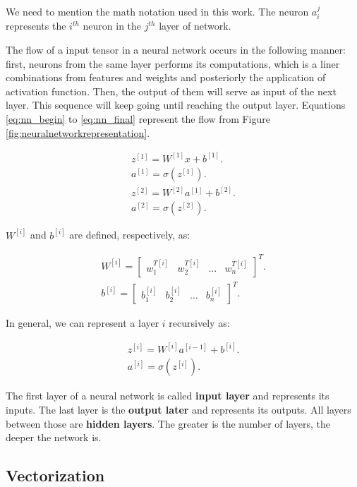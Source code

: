 We need to mention the math notation used in this work. The neuron $a^{j}_{i}$ represents the $i^{th}$ neuron in the $j^{th}$ layer of network.

The flow of a input tensor in a neural network occurs in the following manner: first, neurons from the same layer performs its computations, which is a liner combinations from features and weights and posteriorly the application of activation function. Then, the output of them will serve as input of the next layer. This sequence will keep going until reaching the output layer. Equations \ref{eq:nn_begin} to \ref{eq:nn_final} represent the flow from Figure \ref{fig:neuralnetworkrepresentation}.


\begin{align}\label{eq:nn_begin}
z^{[1]} = W^{[1]}x + b^{[1]}.\\
a^{[1]} = \sigma(z^{[1]}).\\
z^{[2]} = W^{[2]}a^{[1]} + b^{[2]}.\\
a^{[2]} = \sigma(z^{[2]}).
\label{eq:nn_final}
\end{align}

$W^{[i]}$ and $b^{[i]}$ are defined, respectively, as:

\begin{align}
W^{[i]} = \begin{bmatrix}
w^{T[i]}_1 & w^{T[i]}_2 & \dots & w^{T[i]}_n
\end{bmatrix} ^{T}. \\
b^{[i]} = \begin{bmatrix}
b^{[i]}_1 & b^{[i]}_2 & \dots & b^{[i]}_n 
\end{bmatrix} ^{T}.
\end{align}

In general, we can represent a layer $i$ recursively as:

\begin{align}
z^{[i]} = W^{[i]}a^{[i-1]} + b^{[i]}.\\
a^{[i]} = \sigma(z^{[i]}).
\end{align}


The first layer of a neural network is called \textbf{input layer} and represents its inputs. The last layer is the \textbf{output later} and represents its outputs. All layers between those are \textbf{hidden layers}. The greater is the number of layers, the deeper the network is.

\subsection{Vectorization}\label{sec:vectorization}


